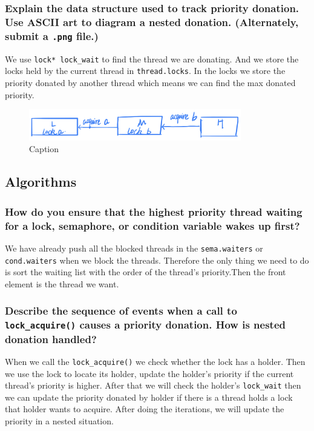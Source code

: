 \documentclass[sigconf, nonacm, balance=false, urlbreakonhyphens=true]{acmart}
\begin{document}
            \subsubsection{Explain the data structure used to track priority donation. Use ASCII art to diagram a nested donation.  (Alternately, submit a \texttt{.png} file.)}

                We use \texttt{lock* lock\_wait} to find the thread we are donating. And we store the locks held by the current thread in \texttt{thread.locks}. In the locks we store the priority donated by another thread which means we can find the max donated priority.
                \noindent \begin{figure}[H]
                    \centering
                    \includegraphics[width=25em]{pic.jpg}
                    \caption{Caption}
                    \label{fig:my_label}
                \end{figure}

        \subsection{Algorithms}

            \subsubsection{How do you ensure that the highest priority thread waiting for a lock, semaphore, or condition variable wakes up first? } 
            
                We have already push all the blocked threads in the \texttt{sema.waiters} or \texttt{cond.waiters} when we block the threads. Therefore the only thing we need to do is sort the waiting list with the order of the thread's priority.Then the front element is the thread we want.

            \subsubsection{Describe the sequence of events when a call to \texttt{lock\_acquire()} causes a priority donation. How is nested donation handled? }

                When we call the \texttt{lock\_acquire()} we check whether the lock has a holder. Then we use the lock to locate its holder, update the holder's priority if the current thread's priority is higher. After that we will check the holder's \texttt{lock\_wait} then we can update the priority donated by holder if there is a thread holds a lock that holder wants to acquire. After doing the iterations, we will update the priority in a nested situation.
\end{document}
